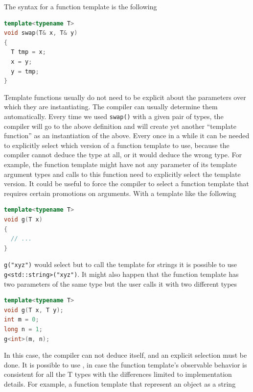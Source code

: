 The syntax for a function template is the following
\begin{lstlisting}[language=C++]
template<typename T>
void swap(T& x, T& y)
{
  T tmp = x;
  x = y;
  y = tmp;
}
\end{lstlisting}

Template functions usually do not need to be explicit about the parameters 
over which they are instantiating. The compiler can usually determine 
them automatically. Every time we used \texttt{swap()} with a given pair 
of types, the compiler will go to the above definition and will create 
yet another “template function” as an instantiation of the above.
\newline
Every once in a while it can be needed to explicitly select which version 
of a function template to use, because the compiler cannot deduce the type 
at all, or it would deduce the wrong type.
\newline
For example, the function template might have not any parameter of its 
template argument types 
and calls to this function need to explicitly select the template version.
\newline
It could be useful to force the compiler to select a function template 
that requires certain promotions on arguments. With a 
template like the following
\begin{lstlisting}[language=C++]
template<typename T>
void g(T x)
{
  // ...
}
\end{lstlisting}
\texttt{g("xyz")} would select  but to call the 
template for strings it is possible to use \texttt{g<std::string>("xyz")}. 
\newline
It might also happen that the function template has two parameters of the  
same type but the user calls it with two different types
\begin{lstlisting}[language=C++]
template<typename T>
void g(T x, T y);
int m = 0;
long n = 1;
g<int>(m, n);
\end{lstlisting}
In this case, the compiler can not deduce itself, and an explicit selection 
must be done.
\newline
It is possible to use , in case the 
function template’s observable behavior is consistent for all 
the T types with the differences limited to implementation details. 
For example, a function template that represent an object as a string 
